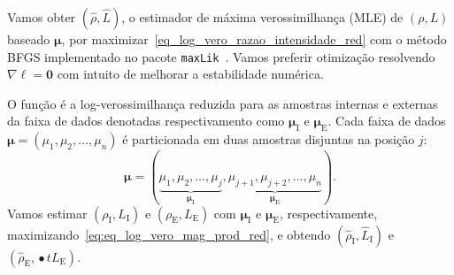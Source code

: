 \documentclass[journal]{IEEEtran}
\begin{document}
Vamos obter $(\widehat \rho, \widehat L)$, o estimador de máxima verossimilhança (MLE) de $(\rho, L)$ baseado $\bm \mu$, por maximizar~\eqref{eq_log_vero_razao_intensidade_red} com o método BFGS implementado no pacote \texttt{maxLik}~\cite{ht}. Vamos preferir otimização resolvendo $\nabla\ell=\bm 0$ com intuito de melhorar a estabilidade numérica.

O função é a log-verossimilhança reduzida para as amostras internas e externas da faixa de dados denotadas respectivamento como $\bm \mu_\text{I}$ e $\bm \mu_\text{E}$. Cada faixa de dados $\bm \mu = (\mu_1,\mu_2,\dots,\mu_n)$ é particionada em duas amostras disjuntas na posição $j$:  
$$
\bm \mu = (\underbrace{\mu_1,\mu_2,\dots,\mu_j}_{\bm \mu_\text{I}}, 
\underbrace{\mu_{j+1}, \mu_{j+2},\dots,\mu_n}_{\bm \mu_\text{E}}).
$$
Vamos estimar $(\rho_\text{I},L_\text{I})$ e $(\rho_\text{E},L_\text{E})$ com $\bm \mu_\text{I}$ e $\bm \mu_\text{E}$, respectivamente, maximizando~\eqref{eq:eq_log_vero_mag_prod_red}, e obtendo $(\widehat{\rho}_\text{I}, \widehat{L}_\text{I})$ e $(\widehat{\rho}_\text{E}, \widehat{•}t{L}_\text{E})$.
\end{document}
